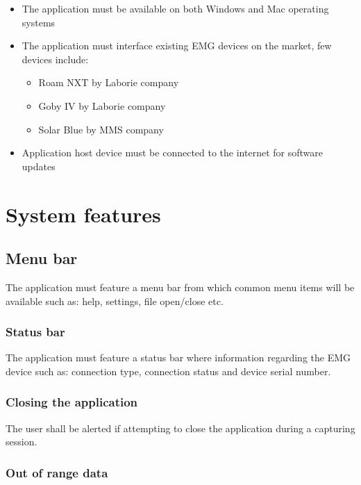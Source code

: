 \documentclass[12pt,a4paper]{article}
\begin{document}
\begin{itemize}
	\item The application must be available on both Windows and Mac operating systems
	\item The application must interface existing EMG devices on the market, few devices include:
	
		\begin{itemize}
			\item Roam NXT by Laborie company
			\item Goby IV by Laborie company
			\item Solar Blue by MMS company
		\end{itemize}

	\item Application host device must be connected to the internet for software updates
\end{itemize}

\newpage

\section{System features}

\subsection{Menu bar}

The application must feature a menu bar from which common menu items will be available such as: help, settings, file open/close etc.

\subsubsection{Status bar}

The application must feature a status bar where information regarding the EMG device such as: connection type, connection status and device serial number.

\subsubsection{Closing the application}

The user shall be alerted if attempting to close the application during a capturing session.

\subsubsection{Out of range data}
\end{document}
